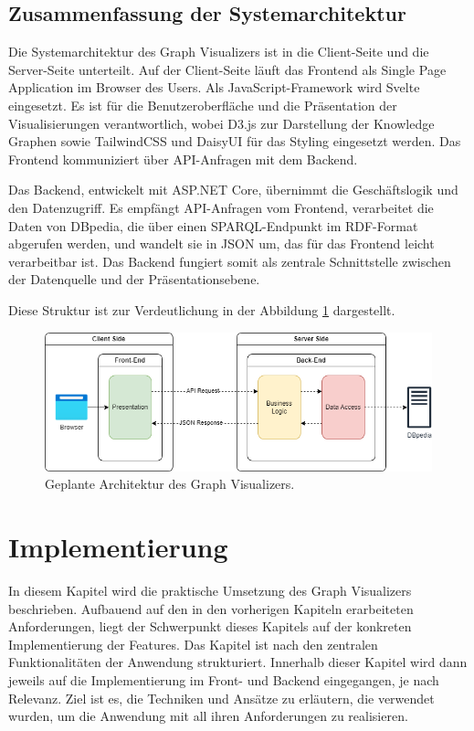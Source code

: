 \subsection{Zusammenfassung der Systemarchitektur}

Die Systemarchitektur des Graph Visualizers ist in die Client-Seite und die Server-Seite unterteilt. Auf der Client-Seite läuft das Frontend als Single Page Application im Browser des Users. Als JavaScript-Framework wird Svelte eingesetzt. Es ist für die Benutzeroberfläche und die Präsentation der Visualisierungen verantwortlich, wobei D3.js zur Darstellung der Knowledge Graphen sowie TailwindCSS und DaisyUI für das Styling eingesetzt werden. Das Frontend kommuniziert über API-Anfragen mit dem Backend.

Das Backend, entwickelt mit ASP.NET Core, übernimmt die Geschäftslogik und den Datenzugriff. Es empfängt API-Anfragen vom Frontend, verarbeitet die Daten von DBpedia, die über einen SPARQL-Endpunkt im RDF-Format abgerufen werden, und wandelt sie in JSON um, das für das Frontend leicht verarbeitbar ist. Das Backend fungiert somit als zentrale Schnittstelle zwischen der Datenquelle und der Präsentationsebene.

Diese Struktur ist zur Verdeutlichung in der Abbildung \ref{fig:realization:concept:architecture} dargestellt.

\begin{figure}[h]
    \centering
    \includegraphics[height=.35\textwidth]{images/03/Architecture.drawio.png}
    \caption{Geplante Architektur des Graph Visualizers.}
    \label{fig:realization:concept:architecture}
\end{figure}

\section{Implementierung}

In diesem Kapitel wird die praktische Umsetzung des Graph Visualizers beschrieben. Aufbauend auf den in den vorherigen Kapiteln erarbeiteten Anforderungen, liegt der Schwerpunkt dieses Kapitels auf der konkreten Implementierung der Features. Das Kapitel ist nach den zentralen Funktionalitäten der Anwendung strukturiert. Innerhalb dieser Kapitel wird dann jeweils auf die Implementierung im Front- und Backend eingegangen, je nach Relevanz. Ziel ist es, die Techniken und Ansätze zu erläutern, die verwendet wurden, um die Anwendung mit all ihren Anforderungen zu realisieren.

